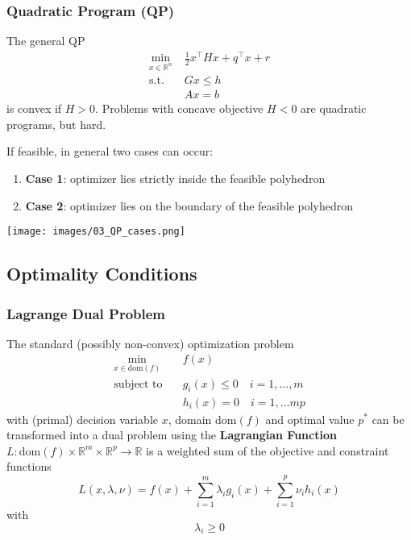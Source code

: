 \subsubsection{Quadratic Program (QP)}
The general QP
\begin{align*}
    \min_{x\in\mathbb{R}^n}\; & \frac{1}{2}x^\top H x + q^\top x + r \\
    \mathrm{s.t.}\;           & Gx \leq h                            \\
                              & Ax = b
\end{align*}
is convex if $H>0$.
\newpar{}
Problems with concave objective $H<0$ are quadratic programs, but hard.

\newpar{}
If feasible, in general two cases can occur:
\begin{enumerate}
    \item \textbf{Case 1}: optimizer lies strictly inside the feasible polyhedron
    \item \textbf{Case 2}: optimizer lies on the boundary of the feasible polyhedron
\end{enumerate}
\begin{center}
    \texttt{[image: images/03\_QP\_cases.png]}
\end{center}

\subsection{Optimality Conditions}

\subsubsection{Lagrange Dual Problem}

The standard (possibly non-convex) optimization problem
\begin{align*}
    \min_{x\in\text{dom}(f)} & f(x)                                \\
    \text{subject to}\quad   & g_i(x)\leq 0 \quad i = 1, \ldots, m \\
                             & h_i(x) = 0 \quad i = 1, \ldots m p
\end{align*}
with (primal) decision variable $x$, domain dom$(f)$ and optimal value $p^*$ can be transformed into a dual problem using the \textbf{Lagrangian Function} $L: \mathrm{dom}\left(f\right)\times\mathbb{R}^m\times\mathbb{R}^p\to\mathbb{R}$ is a weighted sum of the objective and constraint functions
\begin{equation*}
    L(x,\lambda,\nu)=f(x)+\sum_{i=1}^{m}\lambda_i g_i(x) + \sum_{i=1}^{p}\nu_i h_i(x)
\end{equation*}
with
\begin{equation*}
    \lambda_i \geq 0
\end{equation*}

